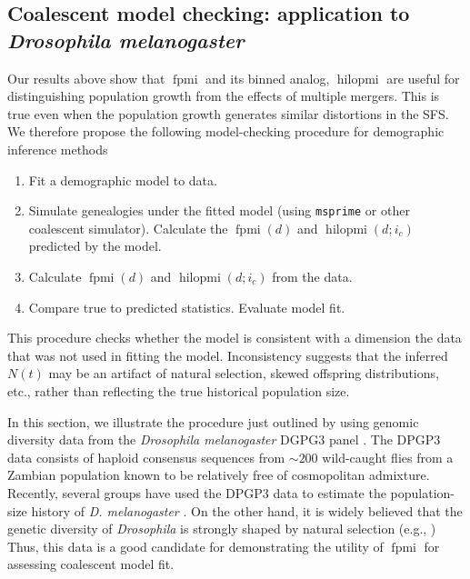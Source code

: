 \documentclass[11pt, letterpaper]{article}   	%
\DeclareMathOperator{\fpmi}{fpmi}
\DeclareMathOperator{\hilopmi}{hilopmi}
\begin{document}
\subsection*{Coalescent model checking: application to \textit{Drosophila melanogaster}}

Our results above show that $\fpmi$ and its binned analog, $\hilopmi$ are useful for distinguishing population growth from the effects of multiple mergers.
This is true even when the population growth generates similar distortions in the SFS.
We therefore propose the following model-checking procedure for demographic inference methods
\begin{enumerate}[label=(\roman*), before=\unskip{: }]
    \item Fit a demographic model to data.
    \item Simulate genealogies under the fitted model (using \texttt{msprime} or other coalescent simulator). Calculate the $\fpmi(d)$ and $\hilopmi(d;i_c)$ predicted by the model.
    \item Calculate $\fpmi(d)$ and $\hilopmi(d;i_c)$ from the data.
    \item Compare true to predicted statistics. Evaluate model fit.
\end{enumerate}
This procedure checks whether the model is consistent with a dimension the data that was not used in fitting the model.
Inconsistency suggests that the inferred $N(t)$ may be an artifact of natural selection, skewed offspring distributions, etc., rather than reflecting the true historical population size.

In this section, we illustrate the procedure just outlined by using genomic diversity data from the \textit{Drosophila melanogaster} DGPG3 panel \cite{LackEtAl2015}.
The DPGP3 data consists of haploid consensus sequences from $\sim 200$ wild-caught flies from a Zambian population known to be relatively free of cosmopolitan admixture.
Recently, several groups have used the DPGP3 data to estimate the population-size history of \textit{D. melanogaster} \autocite{TerhorstEtAl2017,RagsdaleGutenkunst2017}.
On the other hand, it is widely believed that the genetic diversity of \textit{Drosophila} is strongly shaped by natural selection (e.g., \cite{Elyashiv??201?, GarudPetrov2016, others?})
Thus, this data is a good candidate for demonstrating the utility of $\fpmi$ for assessing coalescent model fit.
\end{document}
